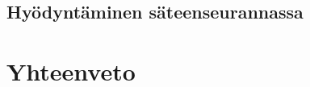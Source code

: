 \documentclass[a4paper, 12pt, titlepage]{article}
\begin{document}



\subsection{Hyödyntäminen säteenseurannassa}




\section{Yhteenveto}

\clearpage

\end{document}
